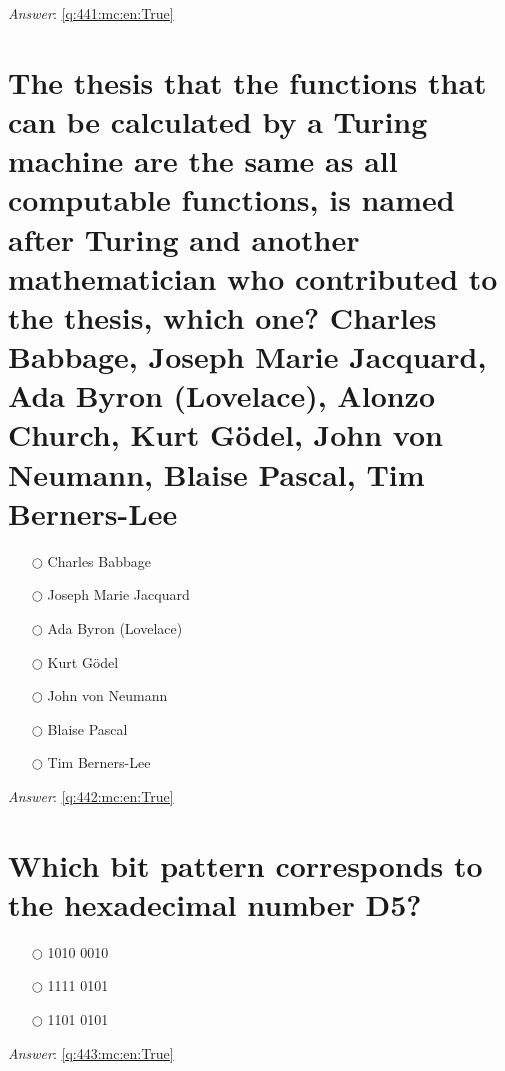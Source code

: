 \documentclass[a4paper,11pt,oneside]{book}
\begin{document}
\begin{sloppypar}
\vspace{1cm}

\textit{Answer}: \autoref{q:441:mc:en:True}



\section{The thesis that the functions that can be calculated by a Turing machine are the same as all computable functions, is named after Turing and another mathematician who contributed to the thesis, which one?  Charles Babbage, Joseph Marie Jacquard, Ada Byron (Lovelace), Alonzo Church, Kurt G\"odel, John von Neumann, Blaise Pascal, Tim Berners-Lee}

\label{q:442:mc:en:False}

\begin{itemize}
  \item[$\bigcirc$] Charles Babbage
  \item[$\bigcirc$] Joseph Marie Jacquard
  \item[$\bigcirc$] Ada Byron (Lovelace)
  \item[$\bigcirc$] Kurt G\"odel
  \item[$\bigcirc$] John von Neumann
  \item[$\bigcirc$] Blaise Pascal
  \item[$\bigcirc$] Tim Berners-Lee
\end{itemize}

\vspace{1cm}

\textit{Answer}: \autoref{q:442:mc:en:True}



\section{Which bit pattern corresponds to the hexadecimal number D5?}

\label{q:443:mc:en:False}

\begin{itemize}
  \item[$\bigcirc$] 1010 0010
  \item[$\bigcirc$] 1111 0101
  \item[$\bigcirc$] 1101 0101
\end{itemize}

\vspace{1cm}

\textit{Answer}: \autoref{q:443:mc:en:True}




\end{sloppypar}
\end{document}

